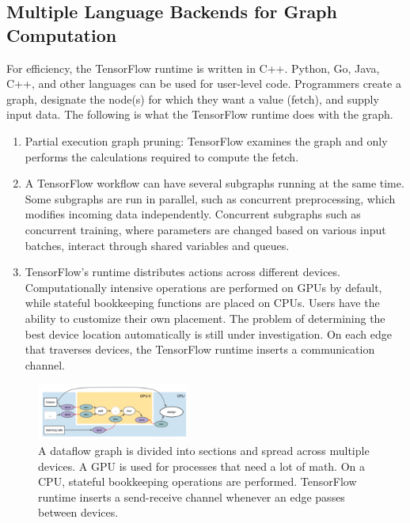 \documentclass[acmlarge]{acmart}
\begin{document}
\subsection{Multiple Language Backends for Graph Computation}
For efficiency, the TensorFlow runtime is written in C++. Python, Go, Java, C++, and other languages can be used for user-level code. Programmers create a graph, designate the node(s) for which they want a value (fetch), and supply input data. The following is what the TensorFlow runtime does with the graph.
\begin{enumerate}
\item Partial execution graph pruning: TensorFlow examines the graph and only performs the calculations required to compute the fetch.
\item A TensorFlow workflow can have several subgraphs running at the same time. Some subgraphs are run in parallel, such as concurrent preprocessing, which modifies incoming data independently. Concurrent subgraphs such as concurrent training, where parameters are changed based on various input batches, interact through shared variables and queues.
\item TensorFlow's runtime distributes actions across different devices. Computationally intensive operations are performed on GPUs by default, while stateful bookkeeping functions are placed on CPUs. Users have the ability to customize their own placement. The problem of determining the best device location automatically is still under investigation. On each edge that traverses devices, the TensorFlow runtime inserts a communication channel.
\end{enumerate}
\begin{figure}[htbp]
  \centering
  \caption{A dataflow graph is divided into sections and spread across multiple devices. A GPU is used for processes that need a lot of math. On a CPU, stateful bookkeeping operations are performed. TensorFlow runtime inserts a send-receive channel whenever an edge passes between devices.}
  \includegraphics[width=5cm]{./gpu.png}
\end{figure}
\end{document}
